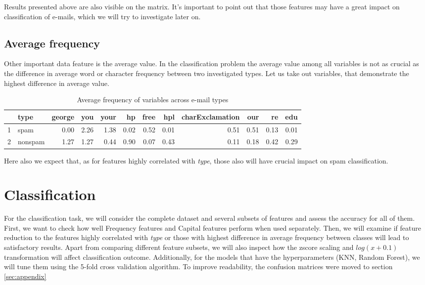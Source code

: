 \documentclass{article}\usepackage[]{graphicx}\usepackage[]{xcolor}
\begin{document}
Results presented above are also visible on the matrix. It's important to point 
out that those features may have a great impact on classification of e-mails,
which we will try to investigate later on.
	
\subsection*{Average frequency}
	
Other important data feature is the average value. In the classification problem 
the average value among all variables is not as crucial as the difference in average 
word or character frequency between two investigated types. Let us take out variables, 
that demonstrate the highest difference in average value.

\begin{table}[ht]
\centering
\begin{tabular}{rlrrrrrrrrrr}
  \hline
 & type & george & you & your & hp & free & hpl & charExclamation & our & re & edu \\ 
  \hline
1 & spam & 0.00 & 2.26 & 1.38 & 0.02 & 0.52 & 0.01 & 0.51 & 0.51 & 0.13 & 0.01 \\ 
  2 & nonspam & 1.27 & 1.27 & 0.44 & 0.90 & 0.07 & 0.43 & 0.11 & 0.18 & 0.42 & 0.29 \\ 
   \hline
\end{tabular}
\caption{Average frequency of variables across e-mail types} 
\label{tab3}
\end{table}


Here also we expect that, as for features highly correlated with \textit{type}, those also will have crucial impact on spam classification.

\clearpage


\section{Classification}

For the classification task, we will consider the complete dataset and several 
subsets of features and assess the accuracy for all of them. First, we want to check
how well Frequency features and Capital features perform when used separately. 
Then, we will examine if feature reduction to the features highly correlated with \textit{type}
or those with highest difference in average frequency between classes will lead 
to satisfactory results. Apart from comparing different feature subsets, we will also
inspect how the zscore scaling and $log(x+0.1)$ transformation will affect classification
outcome. Additionally, for the models that have the hyperparameters (KNN, Random Forest), we will tune them
using the 5-fold cross validation algorithm. To improve readability, the confusion matrices were moved to section \ref{sec:appendix}
\end{document}
